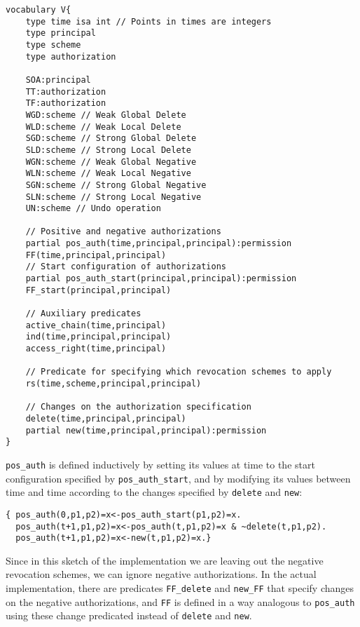 \documentclass[runningheads]{llncs}
\begin{document}
\begin{lstlisting}[caption={The vocabulary of the IDP implementation},label={vocab}]
vocabulary V{
	type time isa int // Points in times are integers
	type principal
	type scheme
	type authorization
	
	SOA:principal
	TT:authorization
	TF:authorization
	WGD:scheme // Weak Global Delete
	WLD:scheme // Weak Local Delete
	SGD:scheme // Strong Global Delete
	SLD:scheme // Strong Local Delete
	WGN:scheme // Weak Global Negative
	WLN:scheme // Weak Local Negative
	SGN:scheme // Strong Global Negative
	SLN:scheme // Strong Local Negative
	UN:scheme // Undo operation
	
	// Positive and negative authorizations
	partial pos_auth(time,principal,principal):permission
	FF(time,principal,principal)
	// Start configuration of authorizations
	partial pos_auth_start(principal,principal):permission
	FF_start(principal,principal)
	
	// Auxiliary predicates
	active_chain(time,principal)
	ind(time,principal,principal)
	access_right(time,principal) 
	
	// Predicate for specifying which revocation schemes to apply
	rs(time,scheme,principal,principal)
	
	// Changes on the authorization specification
	delete(time,principal,principal) 
	partial new(time,principal,principal):permission
}
\end{lstlisting}
\texttt{pos\_{}auth} is defined inductively by setting its values at time  to the start configuration specified by \texttt{pos\_{}auth\_{}start}, and by modifying its values between time  and time  according to the changes specified by \texttt{delete} and \texttt{new}:
\begin{lstlisting}[caption={The definition of the authorization specification at a given time},label={specification}]
{ pos_auth(0,p1,p2)=x<-pos_auth_start(p1,p2)=x.
  pos_auth(t+1,p1,p2)=x<-pos_auth(t,p1,p2)=x & ~delete(t,p1,p2).
  pos_auth(t+1,p1,p2)=x<-new(t,p1,p2)=x.}
\end{lstlisting}
Since in this sketch of the implementation we are leaving out the negative revocation schemes, we can ignore negative authorizations. In the actual implementation, there are predicates \texttt{FF\_{}delete} and \texttt{new\_{}FF} that specify changes on the negative authorizations, and \texttt{FF} is defined in a way analogous to \texttt{pos\_{}auth} using these change predicated instead of \texttt{delete} and \texttt{new}.
\end{document}
